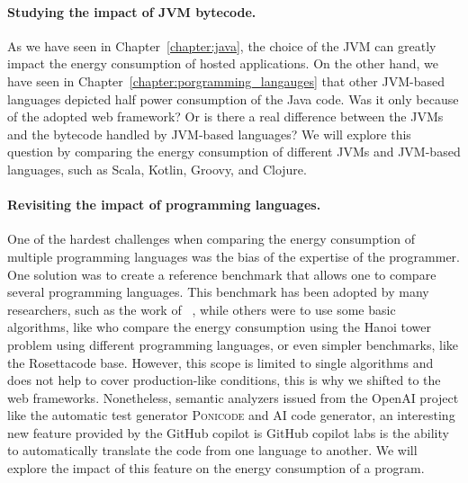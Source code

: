 \paragraph{Studying the impact of JVM bytecode.}
As we have seen in Chapter~\ref{chapter:java}, the choice of the JVM can greatly impact the energy consumption of hosted applications.
On the other hand, we have seen in Chapter~\ref{chapter:porgramming_langauges} that other JVM-based languages depicted half power consumption of the Java code.
Was it only because of the adopted web framework?
Or is there a real difference between the JVMs and the bytecode handled by JVM-based languages?
We will explore this question by comparing the energy consumption of different JVMs and JVM-based languages, such as Scala, Kotlin, Groovy, and Clojure.

\paragraph{Revisiting the impact of programming languages.}
One of the hardest challenges when comparing the energy consumption of multiple programming languages was the bias of the expertise of the programmer.
One solution was to create a reference benchmark that allows one to compare several programming languages.
This benchmark has been adopted by many researchers, such as the work of \citeauthor{couto2017towards}~\cite{couto2017towards}, while others were to use some basic algorithms, like \cite{noureddine_preliminary_2012} who compare the energy consumption using the Hanoi tower problem using different programming languages, or even simpler benchmarks, like the Rosettacode base.
However, this scope is limited to single algorithms and does not help to cover production-like conditions, this is why we shifted to the web frameworks.
Nonetheless, semantic analyzers issued from the OpenAI project like the automatic test generator \textsc{Ponicode} and AI code generator, an interesting new feature provided by the GitHub copilot is GitHub copilot labs is the ability to automatically translate the code from one language to another.
We will explore the impact of this feature on the energy consumption of a program.


